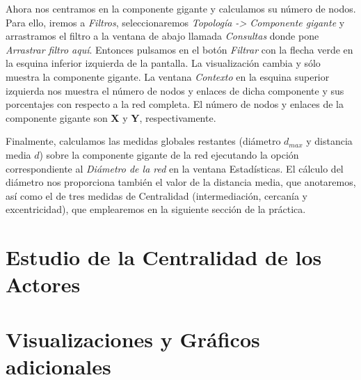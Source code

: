 \documentclass{uimppracticas}
\begin{document}
Ahora nos centramos en la componente gigante y calculamos su número de nodos. Para ello, iremos a \textit{Filtros}, seleccionaremos \textit{Topología -> Componente gigante} y arrastramos el filtro a la ventana de abajo llamada \textit{Consultas} donde pone \textit{Arrastrar filtro aquí}. Entonces pulsamos en el botón \textit{Filtrar} con la flecha verde en la esquina inferior izquierda de la pantalla. La visualización cambia y sólo muestra la componente gigante. La ventana \textit{Contexto} en la esquina superior izquierda nos muestra el número de nodos y enlaces de dicha componente y sus porcentajes con respecto a la red completa. El número de nodos y enlaces de la componente gigante son \textbf{X} y \textbf{Y}, respectivamente.

Finalmente, calculamos las medidas globales restantes (diámetro $d_{max}$ y distancia media $d$) sobre la componente gigante de la red ejecutando la opción correspondiente al \textit{Diámetro de la red} en la ventana {Estadísticas}. El cálculo del diámetro nos proporciona también el valor de la distancia media, que anotaremos, así como el de tres medidas de Centralidad (intermediación, cercanía y excentricidad), que emplearemos en la siguiente sección de la práctica.

\section*{Estudio de la Centralidad de los Actores}

\section*{Visualizaciones y Gráficos adicionales}

%
%

\newpage

\renewcommand{\refname}{Bibliografía}


\end{document}

